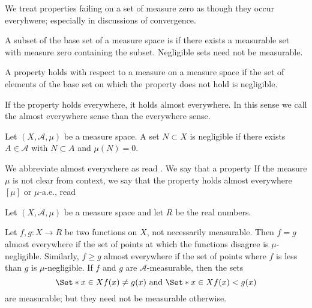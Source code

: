 
\sbasic


















\sstart
{}


We treat properties failing
on a set of measure zero
as
though they occur everyhwere;
especially in discussions of
convergence.


A subset of
the base set of a measure
space is
if there exists a
measurable set
with measure zero
containing
the subset.
Negligible sets
need not be
measurable.


A property holds
with respect to a measure
on a measure space if
the set of elements
of the base set on which
the property does not hold
is negligible.

If the property holds
everywhere, it holds
almost everywhere.
In this sense
we call the
almost everywhere sense
than the everywhere sense.


Let
$(X, \mathcal{A}, \mu)$
be a measure space.
A set
$N \subset X$ is
negligible if there
exists $A \in \mathcal{A}$
with $N \subset A$ and
$\mu(N) = 0$.

We abbreviate almost
everywhere as 
read .
We say that a property
If the measure $\mu$ is
not clear from context,
we say that the property
holds almost everywhere
$[\mu]$ or
$\mu$-a.e., read


Let $(X, \mathcal{A}, \mu)$
be a measure space
and let $R$ be the real numbers.


Let $f, g: X \to R$
be two functions on $X$,
not necessarily measurable.
Then $f = g$ almost everywhere
if the set of points at which the
functions disagree is
$\mu$-negligible.
Similarly, $f \geq g$ almost
everywhere if the set of points
where $f$ is less than $g$
is $\mu$-negligible.
If $f$ and $g$ are
$\mathcal{A}$-measurable, then
the sets
\[
\Set*{x \in X}{f(x) \neq g(x)}
\text{ and }
\Set*{x \in X}{f(x) < g(x)}
\]
are measurable; but they need
not be measurable otherwise.

